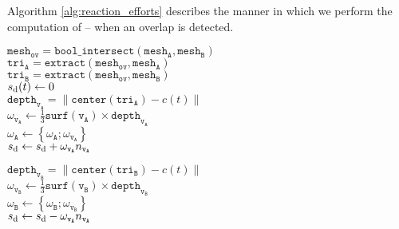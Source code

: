Algorithm \ref{alg:reaction_efforts} describes the manner in which we perform the computation of -- when an overlap is detected.
%
%	
%
\LinesNumbered
\SetAlFnt{\footnotesize}
\IncMargin{0.4em}
\begin{algorithm}[t]
	\DontPrintSemicolon	
	{
		$\texttt{mesh}_\texttt{ov} = \texttt{bool\_intersect} \left( \texttt{mesh}_{\texttt{A}}, \texttt{mesh}_{\texttt{B}} \right)$\\
		\BlankLine\BlankLine
		$\texttt{tri}_\texttt{A} = \texttt{extract} \left( \texttt{mesh}_{\texttt{ov}}, \texttt{mesh}_{\texttt{A}} \right)$\\
		$\texttt{tri}_\texttt{B} = \texttt{extract} \left( \texttt{mesh}_{\texttt{ov}}, \texttt{mesh}_{\texttt{B}} \right)$\\
		$s_{\text d}(t) \leftarrow 0$\\
		{
			$\texttt{depth}_{\texttt{v}_\texttt{A}} = \| \texttt{center}\left( \texttt{tri}_\texttt{A} \right) - c(t) \|$\\
			$\omega_{\texttt{v}_\texttt{A}} \leftarrow \frac{1}{3} \texttt{surf} \left( \texttt{v}_\texttt{A} \right) \times \texttt{depth}_{\texttt{v}_\texttt{A}}$\\
			$\omega_\texttt{A} \leftarrow \left\{\omega_\texttt{A}; \omega_{\texttt{v}_\texttt{A}} \right\}$\\
			$s_{\text d} \leftarrow s_{\text d} + \omega_{\texttt{v}_\texttt{A}} n_{\texttt{v}_\texttt{A}}$\\
		}
	
		{
			$\texttt{depth}_{\texttt{v}_\texttt{B}} = \| \texttt{center}\left( \texttt{tri}_\texttt{B} \right) - c(t) \|$\\
			$\omega_{\texttt{v}_\texttt{B}} \leftarrow \frac{1}{3} \texttt{surf} \left( \texttt{v}_\texttt{B} \right) \times \texttt{depth}_{\texttt{v}_\texttt{B}}$\\
			$\omega_\texttt{B} \leftarrow \left\{\omega_\texttt{B}; \omega_{\texttt{v}_\texttt{B}} \right\}$\\
			$s_{\text d} \leftarrow s_{\text d} - \omega_{\texttt{v}_\texttt{A}} n_{\texttt{v}_\texttt{A}}$\\
		}
		
}
\end{algorithm}
